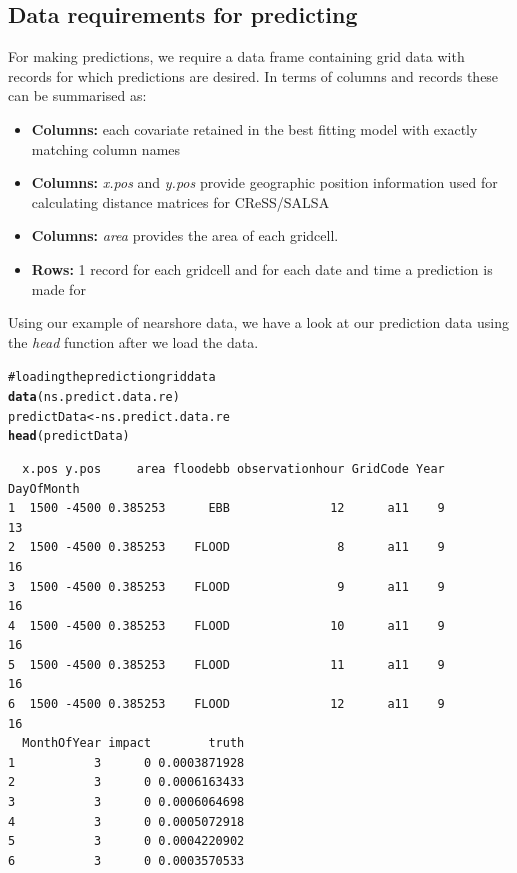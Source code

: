 \documentclass[11pt, a4paper]{article}
\makeatletter
\newcommand{\hlfunctioncall}[1]{\textcolor[rgb]{0.501960784313725,0,0.329411764705882}{\textbf{#1}}}%
\newcommand{\hlcomment}[1]{\textcolor[rgb]{0.180392156862745,0.6,0.341176470588235}{#1}}%
\newenvironment{kframe}{%
 \def\at@end@of@kframe{}%
 \ifinner\ifhmode%
  \def\at@end@of@kframe{\end{minipage}}%
  \begin{minipage}{\columnwidth}%
 \fi\fi%
 \def\FrameCommand##1{\hskip\@totalleftmargin \hskip-\fboxsep
 \colorbox{shadecolor}{##1}\hskip-\fboxsep
     \hskip-\linewidth \hskip-\@totalleftmargin \hskip\columnwidth}%
 \MakeFramed {\advance\hsize-\width
   \@totalleftmargin\z@ \linewidth\hsize
   \@setminipage}}%
 {\par\unskip\endMakeFramed%
 \at@end@of@kframe}
\newenvironment{knitrout}{}{} %
\makeatother
\begin{document}
\subsection{Data requirements for predicting}
For making predictions, we require a data frame containing grid data with records for which predictions are desired. In terms of columns and records these can be summarised as:\\
\large
\begin{itemize}
\item{\textbf{Columns:} each covariate retained in the best fitting model with exactly matching column names}
\item{\textbf{Columns:} \textit{x.pos} and \textit{y.pos} provide geographic position information used for calculating distance matrices for CReSS/SALSA}
\item{\textbf{Columns:} \textit{area} provides the area of each gridcell. }
\item{\textbf{Rows:} 1 record for each gridcell and for each date and time a prediction is made for}
\end{itemize}

\noindent Using our example of nearshore data, we have a look at our prediction data using the \textit{head} function after we load the data. 
\begin{knitrout}\footnotesize
{}\color{fgcolor}\begin{kframe}
\begin{alltt}
\hlcomment{# loading the prediction grid data}
\hlfunctioncall{data}(ns.predict.data.re)
predictData <- ns.predict.data.re
\hlfunctioncall{head}(predictData)
\end{alltt}
\begin{verbatim}
  x.pos y.pos     area floodebb observationhour GridCode Year DayOfMonth
1  1500 -4500 0.385253      EBB              12      a11    9         13
2  1500 -4500 0.385253    FLOOD               8      a11    9         16
3  1500 -4500 0.385253    FLOOD               9      a11    9         16
4  1500 -4500 0.385253    FLOOD              10      a11    9         16
5  1500 -4500 0.385253    FLOOD              11      a11    9         16
6  1500 -4500 0.385253    FLOOD              12      a11    9         16
  MonthOfYear impact        truth
1           3      0 0.0003871928
2           3      0 0.0006163433
3           3      0 0.0006064698
4           3      0 0.0005072918
5           3      0 0.0004220902
6           3      0 0.0003570533
\end{verbatim}
\end{kframe}
\end{knitrout}
\end{document}
